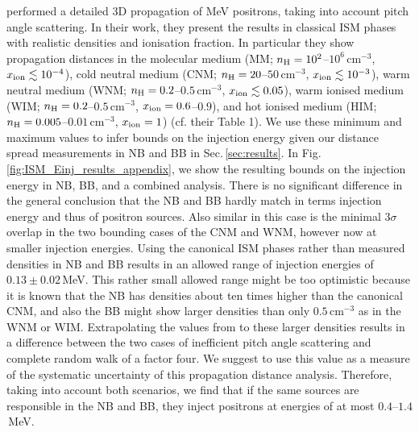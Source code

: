 \documentclass[doublespace,nopageskip]{VTthesis} %
\newcommand{\mrm}[1]{\mathrm{#1}}
\begin{document}
\citet{Jean2009_511ISM} performed a detailed 3D propagation of MeV positrons, taking into account pitch angle scattering.
%
In their work, they present the results in classical ISM phases with realistic densities and ionisation fraction.
%
In particular they show propagation distances in the molecular medium (MM; $n_{\rm H} = 10^2$--$10^6\,\mrm{cm^{-3}}$, $x_{\rm ion} \lesssim 10^{-4}$), cold neutral medium (CNM; $n_{\rm H} = 20$--$50\,\mrm{cm^{-3}}$, $x_{\rm ion} \lesssim 10^{-3}$), warm neutral medium (WNM; $n_{\rm H} = 0.2$--$0.5\,\mrm{cm^{-3}}$, $x_{\rm ion} \lesssim 0.05$), warm ionised medium (WIM; $n_{\rm H} = 0.2$--$0.5\,\mrm{cm^{-3}}$, $x_{\rm ion} = 0.6$--$0.9$), and hot ionised medium (HIM; $n_{\rm H} = 0.005$--$0.01\,\mrm{cm^{-3}}$, $x_{\rm ion} = 1$) (cf. their Table 1).
%
We use these minimum and maximum values to infer bounds on the injection energy given our distance spread measurements in NB and BB in Sec.\,\ref{sec:results}.
%
In Fig.\,\ref{fig:ISM_Einj_results_appendix}, we show the resulting bounds on the injection energy in NB, BB, and a combined analysis.
%	
There is no significant difference in the general conclusion that the NB and BB hardly match in terms injection energy and thus of positron sources.
%
Also similar in this case is the minimal $3\sigma$ overlap in the two bounding cases of the CNM and WNM, however now at smaller injection energies.
%
Using the canonical ISM phases rather than measured densities in NB and BB results in an allowed range of injection energies of $0.13 \pm 0.02$\,MeV.
%
This rather small allowed range might be too optimistic because it is known that the NB has densities about ten times higher than the canonical CNM, and also the BB might show larger densities than only $0.5\,\mrm{cm^{-3}}$ as in the WNM or WIM.
%
Extrapolating the values from \citet{Jean2009_511ISM} to these larger densities results in a difference between the two cases of inefficient pitch angle scattering and complete random walk of a factor four.
%
We suggest to use this value as a measure of the systematic uncertainty of this propagation distance analysis.
%
Therefore, taking into account both scenarios, we find that if the same sources are responsible in the NB and BB, they inject positrons at energies of at most $0.4$--$1.4$\,MeV.
\end{document}
